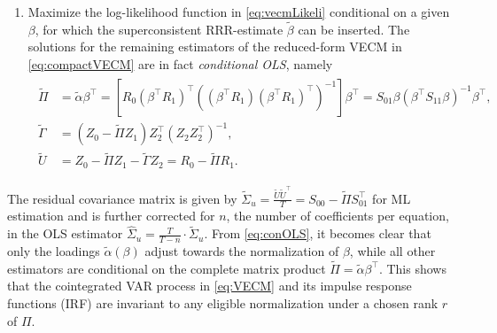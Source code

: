 \begin{enumerate}[label=\textbf{\arabic*.}]
	\item Maximize the log-likelihood function in \eqref{eq:vecmLikeli} conditional on a given $ \beta $, for which the superconsistent RRR-estimate $ \widetilde{\beta} $ can be inserted. The solutions for the remaining estimators of the reduced-form VECM in \eqref{eq:compactVECM} are in fact \textit{conditional OLS}, namely
	\begin{align} \label{eq:conOLS}
	\begin{split}
		\widetilde{\Pi} & = \widetilde{\alpha} \beta^\top = \left[ R^{\ }_0 \left( \beta^\top R^{\ }_1 \right)^\top \left( \left( \beta^\top R^{\ }_1 \right) \left( \beta^\top R^{\ }_1 \right)^\top \right)^{-1} \right] \beta^\top = S_{01} \beta \left( \beta^\top S_{11} \beta \right)^{-1} \beta^\top, \\
		\widetilde{\Gamma} & = \left( Z^{\ }_0 - \widetilde{\Pi} Z^{\ }_1 \right) Z_2^\top ( Z^{\ }_2 Z_2^\top )^{-1}, \\
		\widetilde{U} & = Z^{\ }_0 - \widetilde{\Pi} Z^{\ }_1 - \widetilde{\Gamma} Z^{\ }_2 = R^{\ }_0 - \widetilde{\Pi} R^{\ }_1.
	\end{split}
	\end{align}
\end{enumerate}
The residual covariance matrix is given by $ \widetilde{\Sigma}_u = \frac{\widetilde{U} \widetilde{U}^\top}{T} = S_{00} - \widetilde{\Pi} S_{01}^\top $ for ML estimation and is further corrected for $ n $, the number of coefficients per equation, in the OLS estimator $ \widehat{\Sigma}_u = \frac{T}{T-n} \cdot \widetilde{\Sigma}_u $. From \eqref{eq:conOLS}, it becomes clear that only the loadings $ \widetilde{\alpha}(\beta) $ adjust towards the normalization of $ \beta $, while all other estimators are conditional on the complete matrix product $ \widetilde{\Pi} = \widetilde{\alpha} \beta^\top $. This shows that the cointegrated VAR process in \eqref{eq:VECM} and its impulse response functions (IRF) are invariant to any eligible normalization under a chosen rank $ r $ of $ \Pi $.


